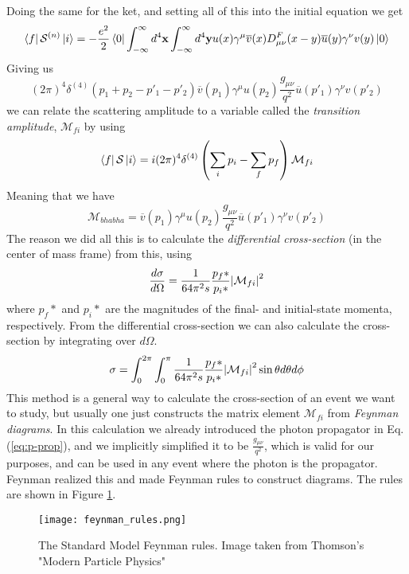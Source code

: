 \documentclass[12pt, a4paper]{book}
\begin{document}
Doing the same for the ket, and setting all of this into the initial equation we get
$$
\bra{f}\mathcal{S}^{(n)}\ket{i} = -\frac{e^2}{2}\bra{0}\int_{-\infty}^{\infty}d^4\mathbf{x} \int_{-\infty}^{\infty}d^4\mathbf{y} u(x)\gamma^\mu\overline{v}(x)D_{\mu\nu}^F(x-y)\overline{u}(y)\gamma^\nu v(y)\ket{0}
$$
Giving us
$$
(2\pi)^4\delta^{(4)}(p_1+p_2-p'_1-p'_2)\overline{v}(p_1)\gamma^\mu u(p_2) \frac{g_{\mu\nu}}{q^2}\overline{u}(p'_1)\gamma^\nu v(p'_2)
$$
we can relate the scattering amplitude to a variable called the \textit{transition amplitude}, $\mathcal{M}_{fi}$ by using 
$$
\bra{f}\mathcal{S}\ket{i} = i(2\pi)^4\delta^{(4)}\left(\sum_i p_i -\sum_f p_f\right)\mathcal{M}_{fi}
$$
Meaning that we have
$$
\mathcal{M}_{bhabha} = \overline{v}(p_1)\gamma^\mu u(p_2) \frac{g_{\mu\nu}}{q^2}\overline{u}(p'_1)\gamma^\nu v(p'_2)
$$
The reason we did all this is to calculate the \textit{differential cross-section} (in the center of mass frame) from this, using
\begin{equation}\label{eq:diff_cross}
    \frac{d\sigma}{d\Omega} = \frac{1}{64\pi^2s}\frac{p_f*}{p_i*}\abs{\mathcal{M}_{fi}}^2
\end{equation}
where $p_f*$ and $p_i*$ are the magnitudes of the final- and initial-state momenta, respectively. From the differential cross-section we can also calculate the cross-section by integrating over $d\Omega$. 
\begin{equation}\label{eq:cross_sec}
    \sigma = \int_{0}^{2\pi}\int_{0}^{\pi}\frac{1}{64\pi^2s}\frac{p_f*}{p_i*}\abs{\mathcal{M}_{fi}}^2 \sin\theta d\theta d\phi
\end{equation}
This method is a general way to calculate the cross-section of an event we want to study, but usually one just constructs the matrix element $\mathcal{M}_{fi}$ from \textit{Feynman diagrams}. In this calculation we 
already introduced the photon propagator in Eq. (\ref{eq:p-prop}), and we implicitly simplified it to be $\frac{g_{\mu\nu}}{q^2}$, which is valid for our purposes, and can be used in any event where the photon is the propagator. 
Feynman realized this and made Feynman rules to construct diagrams. The rules are shown in Figure \ref{fig:feynman_rules}. \\
\graphicspath{{../../figures/}}
\begin{figure}[!ht]
    \centering
    \texttt{[image: feynman\_rules.png]}
    \caption[Standard Model Feynman Rules]{The Standard Model Feynman rules. Image taken from Thomson's "Modern Particle Physics" \cite{THOMSON}}\label{fig:feynman_rules}
\end{figure}
\end{document}
